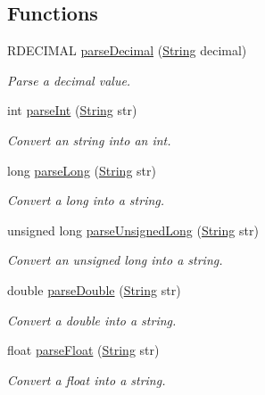 \subsection*{Functions}
\begin{DoxyCompactItemize}
\item 
R\+D\+E\+C\+I\+M\+AL \hyperlink{namespace_rad_j_a_v_afb127eaa0609cdc7d800f9239bd59e98}{parse\+Decimal} (\hyperlink{class_rad_j_a_v_1_1_string}{String} decimal)
\begin{DoxyCompactList}\small\item\em Parse a decimal value. \end{DoxyCompactList}\item 
int \hyperlink{namespace_rad_j_a_v_a49f8eb01edf646954f8695daccc62fd6}{parse\+Int} (\hyperlink{class_rad_j_a_v_1_1_string}{String} str)
\begin{DoxyCompactList}\small\item\em Convert an string into an int. \end{DoxyCompactList}\item 
long \hyperlink{namespace_rad_j_a_v_a3ff124a25d6c3f369fb0c6549b8cc715}{parse\+Long} (\hyperlink{class_rad_j_a_v_1_1_string}{String} str)
\begin{DoxyCompactList}\small\item\em Convert a long into a string. \end{DoxyCompactList}\item 
unsigned long \hyperlink{namespace_rad_j_a_v_ac8f5f34f742526d09fcc982780f97c43}{parse\+Unsigned\+Long} (\hyperlink{class_rad_j_a_v_1_1_string}{String} str)
\begin{DoxyCompactList}\small\item\em Convert an unsigned long into a string. \end{DoxyCompactList}\item 
double \hyperlink{namespace_rad_j_a_v_a6aeeb0a6113b36fc86478e43a2792935}{parse\+Double} (\hyperlink{class_rad_j_a_v_1_1_string}{String} str)
\begin{DoxyCompactList}\small\item\em Convert a double into a string. \end{DoxyCompactList}\item 
float \hyperlink{namespace_rad_j_a_v_a5ca1dcc1c7f181ae77b19c1b3c31a70a}{parse\+Float} (\hyperlink{class_rad_j_a_v_1_1_string}{String} str)
\begin{DoxyCompactList}\small\item\em Convert a float into a string. \end{DoxyCompactList}\item 

\end{DoxyCompactItemize}
